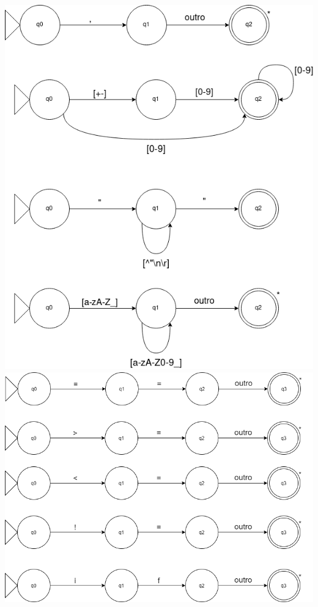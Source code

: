 \documentclass[
	12pt,				%
	openright,			%
	twoside,			%
	a4paper,			%
	english,			%
	french,				%
	spanish,			%
	brazil				%
	]{abntex2}
\begin{document}
\\
\includegraphics[scale=0.7]{4.png}
\\
\includegraphics[scale=0.7]{5.png}
\\
\end{document}

